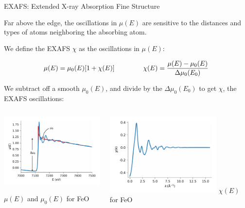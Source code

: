 
 \begin{slide}{EXAFS: Extended X-ray Absorption Fine Structure}

 \begin{cenpage}{130mm}

   Far above the edge, the oscillations in $\mu(E)$ are sensitive to the
   distances and types of atoms neighboring the absorbing atom.  \vmm

  We define the EXAFS $\chi$ as the oscillations in $\mu(E)$:

   \[
     \mu(E) =   \mu_0(E) [1 + \chi(E)]
     \hspace{15mm} \chi(E) =   \frac{ {\mu(E) - \mu_0(E)}}{\Delta \mu_0(E_0)}
   \]

   We subtract off a smooth {}
   $\mu_0(E)$, and divide by the {}
   $\Delta \mu_0(E_0)$ to get $\chi$, the EXAFS oscillations:

   \begin{columns}[T]
     \begin{column}{65mm}
       \includegraphics[width=58mm]{figs/rimg/mu_with_mu0}

       \hspace{10mm} $\mu(E)$ and $\mu_0(E)$ for FeO       
     \end{column}
     \begin{column}{65mm}
       \includegraphics[width=58mm]{figs/rimg/chie}
       \hspace{10mm} $\chi(E)$ for FeO
     \end{column}     
   \end{columns}

 \end{cenpage}

 \vfill
\end{slide}

